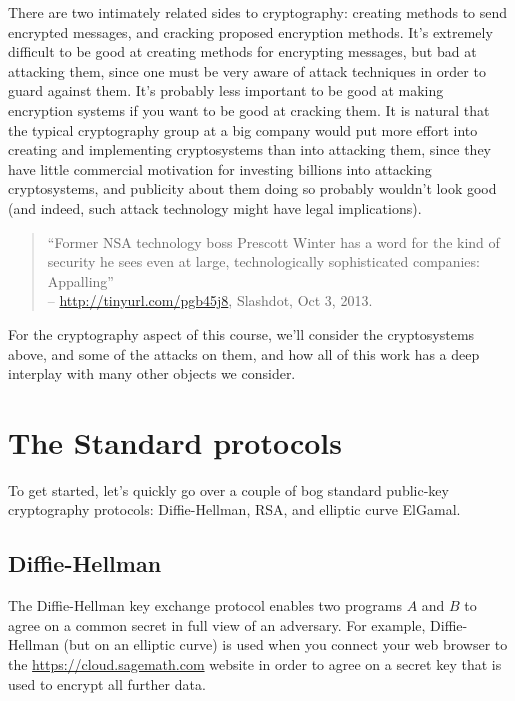 \documentclass{book}
\begin{document}
There are two intimately related sides to cryptography:
creating methods to send encrypted messages,
and cracking proposed encryption methods.
It's extremely difficult to be good at
creating methods for encrypting messages, but
bad at attacking them, since one must be very aware of
attack techniques in order to guard against them.
It's probably less important to be good at making encryption
systems if you want to be good at cracking them.
It is natural that the typical cryptography group at a big
company would put more effort into
creating and implementing cryptosystems than into attacking them,
since they
have little commercial motivation for investing billions
into attacking cryptosystems,
and publicity about them doing so probably wouldn't look
good (and indeed, such attack technology might have legal implications).
\begin{quote}
``Former NSA technology boss Prescott Winter has a word for the kind of security he sees even at large, technologically sophisticated companies: Appalling''\\
 -- \url{http://tinyurl.com/pgb45j8}, Slashdot, Oct 3, 2013.
\end{quote}

For the cryptography aspect of this course, we'll consider the cryptosystems above, and some of the attacks on them, and how all of this work
has a deep interplay with many other objects we consider.


\section{The Standard protocols}
To get started, let's quickly go over a couple of bog
standard public-key cryptography protocols: Diffie-Hellman,
RSA, and elliptic curve ElGamal.

\subsection{Diffie-Hellman}
The Diffie-Hellman key exchange protocol enables two
programs $A$ and $B$ to agree on a common secret in full view of an
adversary.   For example, Diffie-Hellman (but on an elliptic curve)
is used  when you connect your web browser to the
\url{https://cloud.sagemath.com} website in order to agree
on a secret key that is used to encrypt all further data.
\end{document}
